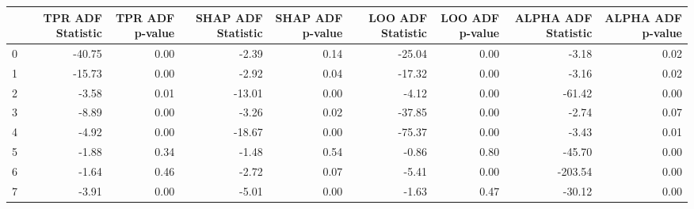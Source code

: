 \begin{tabular}{lrrrrrrrr}
\toprule
 & TPR ADF Statistic & TPR ADF p-value & SHAP ADF Statistic & SHAP ADF p-value & LOO ADF Statistic & LOO ADF p-value & ALPHA ADF Statistic & ALPHA ADF p-value \\
\midrule
0 & -40.75 & 0.00 & -2.39 & 0.14 & -25.04 & 0.00 & -3.18 & 0.02 \\
1 & -15.73 & 0.00 & -2.92 & 0.04 & -17.32 & 0.00 & -3.16 & 0.02 \\
2 & -3.58 & 0.01 & -13.01 & 0.00 & -4.12 & 0.00 & -61.42 & 0.00 \\
3 & -8.89 & 0.00 & -3.26 & 0.02 & -37.85 & 0.00 & -2.74 & 0.07 \\
4 & -4.92 & 0.00 & -18.67 & 0.00 & -75.37 & 0.00 & -3.43 & 0.01 \\
5 & -1.88 & 0.34 & -1.48 & 0.54 & -0.86 & 0.80 & -45.70 & 0.00 \\
6 & -1.64 & 0.46 & -2.72 & 0.07 & -5.41 & 0.00 & -203.54 & 0.00 \\
7 & -3.91 & 0.00 & -5.01 & 0.00 & -1.63 & 0.47 & -30.12 & 0.00 \\
\bottomrule
\end{tabular}
